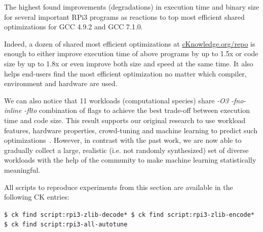   \begin{table}[]
    \centering
    \caption{
      The highest found improvements (degradations) in execution time and binary size 
      for several important RPi3 programs 
      as reactions to top most efficient shared optimizations 
      for GCC 4.9.2 and GCC 7.1.0.
    }
    \label{fig:crowdtuning-all-rpi3-progs}
  \end{table}

Indeed, a dozen of shared most efficient optimizations at \href{http://cKnowledge.org/repo}{cKnowledge.org/repo} 
is enough to either improve execution time of above programs by up to 1.5x or code size by up to 1.8x or even
improve both size and speed at the same time.
%
It also helps end-users find the most efficient optimization no matter which compiler, environment and hardware are used.

We can also notice that 11 workloads (computational species) 
share \textit{-O3 -fno-inline -flto} combination of flags 
to achieve the best trade-off between execution time and code size.
%
This result supports our original research to use workload features, 
hardware properties, crowd-tuning and  machine learning
to predict such optimizations~\cite{Fur2009,29db2248aba45e59:a31e374796869125,cm:29db2248aba45e59:cd11e3a188574d80}.
%
However, in contrast with the past work, we are now able
to gradually collect a large, realistic (i.e. not randomly
synthesized) set of diverse workloads with the help of the
community to make machine learning statistically meaningful.

All scripts to reproduce experiments from this section are available in the following CK entries:

\begin{flushleft}
\texttt{\$ ck find script:rpi3-zlib-decode*\newline
\$ ck find script:rpi3-zlib-encode*\newline
\$ ck find script:rpi3-all-autotune}
\end{flushleft}
